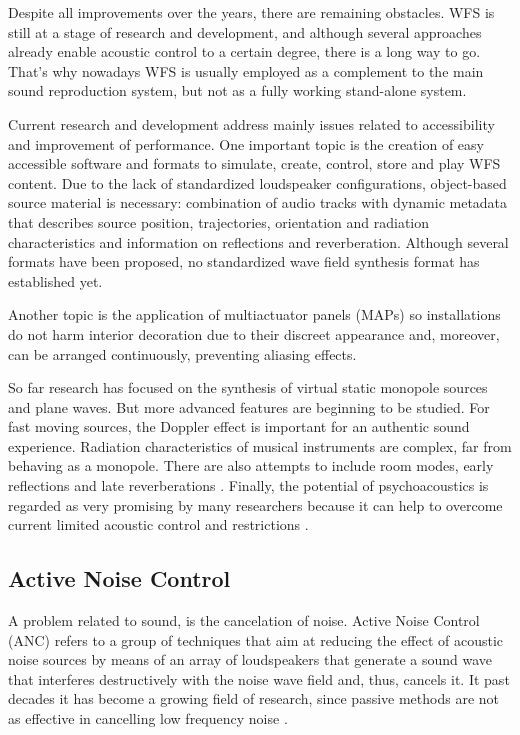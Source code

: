 Despite all improvements over the years, there are remaining obstacles. WFS is still at a stage of research and development, and although several approaches already enable acoustic control to a certain degree, there is a long way to go.
That's why nowadays WFS is usually employed as a complement to the main sound reproduction system, but not as a fully working stand-alone system.

Current research and development address mainly issues related to accessibility and improvement of performance. One important topic is the creation of easy accessible software and formats to simulate, create, control, store and play WFS content. Due to the lack of standardized loudspeaker configurations, object-based source material is necessary: combination of audio tracks with dynamic metadata that describes source position, trajectories, orientation and radiation characteristics and information on reflections and reverberation. Although several formats have been proposed, no standardized wave field synthesis format has established yet.

Another topic is the application of multiactuator panels (MAPs) so installations do not harm interior decoration due to their discreet appearance and, moreover, can be arranged continuously, preventing aliasing effects.

So far research has focused on the synthesis of virtual static monopole sources and plane waves. But more advanced features are beginning to be studied. For fast moving sources, the Doppler effect is important for an authentic sound experience. Radiation characteristics of musical instruments are complex, far from behaving as a monopole. There are also attempts to include room modes, early reflections and late reverberations \cite{Ahrens2014}. Finally, the potential of psychoacoustics is regarded as very promising by many researchers because it can help to overcome current limited acoustic control and restrictions \cite{Musicology}.

\subsection{Active Noise Control}
A problem related to sound, is the cancelation of noise. Active Noise Control (ANC) refers to a group of techniques that aim at reducing the effect of acoustic noise sources by means of an array of loudspeakers that generate a sound wave that interferes destructively with the noise wave field and, thus, cancels it. It past decades it has become a growing field of research, since passive methods are not as effective in cancelling low frequency noise \cite{Lapini2016}.

